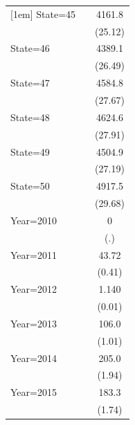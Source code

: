 \documentclass{article}
\begin{document}
{\begin{longtable}{l*{2}{c}}
[1em]
State=45            &                     &      4161.8\sym{***}\\
                    &                     &     (25.12)         \\
[1em]
State=46            &                     &      4389.1\sym{***}\\
                    &                     &     (26.49)         \\
[1em]
State=47            &                     &      4584.8\sym{***}\\
                    &                     &     (27.67)         \\
[1em]
State=48            &                     &      4624.6\sym{***}\\
                    &                     &     (27.91)         \\
[1em]
State=49            &                     &      4504.9\sym{***}\\
                    &                     &     (27.19)         \\
[1em]
State=50            &                     &      4917.5\sym{***}\\
                    &                     &     (29.68)         \\
[1em]
Year=2010           &                     &           0         \\
                    &                     &         (.)         \\
[1em]
Year=2011           &                     &       43.72         \\
                    &                     &      (0.41)         \\
[1em]
Year=2012           &                     &       1.140         \\
                    &                     &      (0.01)         \\
[1em]
Year=2013           &                     &       106.0         \\
                    &                     &      (1.01)         \\
[1em]
Year=2014           &                     &       205.0         \\
                    &                     &      (1.94)         \\
[1em]
Year=2015           &                     &       183.3         \\
                    &                     &      (1.74)         \\

\end{longtable}}
\end{document}
